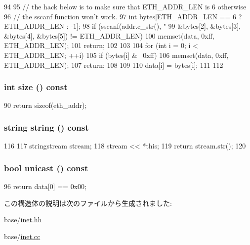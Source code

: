 \begin{DoxyCode}
94 {
95     // the hack below is to make sure that ETH_ADDR_LEN is 6 otherwise
96     // the sscanf function won't work.
97     int bytes[ETH_ADDR_LEN == 6 ? ETH_ADDR_LEN : -1];
98     if (sscanf(addr.c_str(), "%
99                &bytes[2], &bytes[3], &bytes[4], &bytes[5]) != ETH_ADDR_LEN) {
100         memset(data, 0xff, ETH_ADDR_LEN);
101         return;
102     }
103 
104     for (int i = 0; i < ETH_ADDR_LEN; ++i) {
105         if (bytes[i] & ~0xff) {
106             memset(data, 0xff, ETH_ADDR_LEN);
107             return;
108         }
109 
110         data[i] = bytes[i];
111     }
112 }
\end{DoxyCode}
\hypertarget{structNet_1_1EthAddr_ab8e4e3e2a7bf18888b71bdf9dda0770b}{
\subsubsection[{size}]{\setlength{\rightskip}{0pt plus 5cm}int size () const}}
\label{structNet_1_1EthAddr_ab8e4e3e2a7bf18888b71bdf9dda0770b}



\begin{DoxyCode}
90 { return sizeof(eth_addr); }
\end{DoxyCode}
\hypertarget{structNet_1_1EthAddr_a14a0e4fdb44bd7be64a3c6e5d94f8f0e}{
\subsubsection[{string}]{\setlength{\rightskip}{0pt plus 5cm}string string () const}}
\label{structNet_1_1EthAddr_a14a0e4fdb44bd7be64a3c6e5d94f8f0e}



\begin{DoxyCode}
116 {
117     stringstream stream;
118     stream << *this;
119     return stream.str();
120 }
\end{DoxyCode}
\hypertarget{structNet_1_1EthAddr_a45303c1f67152b8e55f3883c04910da5}{
\subsubsection[{unicast}]{\setlength{\rightskip}{0pt plus 5cm}bool unicast () const}}
\label{structNet_1_1EthAddr_a45303c1f67152b8e55f3883c04910da5}



\begin{DoxyCode}
96 { return data[0] == 0x00; }
\end{DoxyCode}


この構造体の説明は次のファイルから生成されました:\begin{DoxyCompactItemize}
\item 
base/\hyperlink{inet_8hh}{inet.hh}\item 
base/\hyperlink{inet_8cc}{inet.cc}\end{DoxyCompactItemize}

